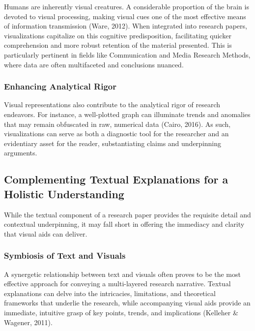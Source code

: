 \documentclass[
  b5paper]{book}
\begin{document}
Humans are inherently visual creatures. A considerable proportion of the brain is devoted to visual processing, making visual cues one of the most effective means of information transmission (Ware, 2012). When integrated into research papers, visualizations capitalize on this cognitive predisposition, facilitating quicker comprehension and more robust retention of the material presented. This is particularly pertinent in fields like Communication and Media Research Methods, where data are often multifaceted and conclusions nuanced.

\hypertarget{enhancing-analytical-rigor}{%
\subsubsection*{Enhancing Analytical Rigor}\label{enhancing-analytical-rigor}}

Visual representations also contribute to the analytical rigor of research endeavors. For instance, a well-plotted graph can illuminate trends and anomalies that may remain obfuscated in raw, numerical data (Cairo, 2016). As such, visualizations can serve as both a diagnostic tool for the researcher and an evidentiary asset for the reader, substantiating claims and underpinning arguments.

\hypertarget{complementing-textual-explanations-for-a-holistic-understanding}{%
\subsection*{Complementing Textual Explanations for a Holistic Understanding}\label{complementing-textual-explanations-for-a-holistic-understanding}}

While the textual component of a research paper provides the requisite detail and contextual underpinning, it may fall short in offering the immediacy and clarity that visual aids can deliver.

\hypertarget{symbiosis-of-text-and-visuals}{%
\subsubsection*{Symbiosis of Text and Visuals}\label{symbiosis-of-text-and-visuals}}

A synergetic relationship between text and visuals often proves to be the most effective approach for conveying a multi-layered research narrative. Textual explanations can delve into the intricacies, limitations, and theoretical frameworks that underlie the research, while accompanying visual aids provide an immediate, intuitive grasp of key points, trends, and implications (Kelleher \& Wagener, 2011).
\end{document}
